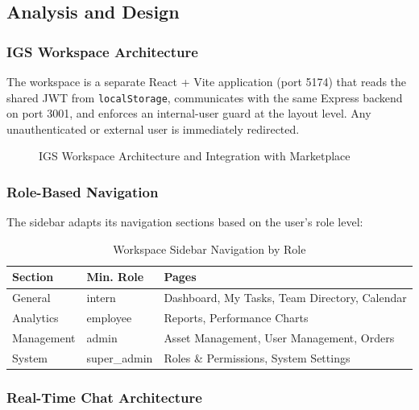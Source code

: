 \subsection{Analysis and Design}

\subsubsection{IGS Workspace Architecture}

The workspace is a separate React + Vite application (port 5174) that reads the shared JWT from \texttt{localStorage}, communicates with the same Express backend on port 3001, and enforces an internal-user guard at the layout level. Any unauthenticated or external user is immediately redirected.

\begin{figure}[H]
\centering
\resizebox{0.95\textwidth}{!}{}
\caption{IGS Workspace Architecture and Integration with Marketplace}
\label{fig:sprint5_arch}
\end{figure}

\subsubsection{Role-Based Navigation}

The sidebar adapts its navigation sections based on the user's role level:

\begin{table}[H]
\centering
\caption{Workspace Sidebar Navigation by Role}
\begin{tabular}{L{3.5cm} L{3cm} L{7cm}}
\toprule
\textbf{Section}  & \textbf{Min. Role}  & \textbf{Pages} \\
\midrule
General           & intern              & Dashboard, My Tasks, Team Directory, Calendar \\
Analytics         & employee            & Reports, Performance Charts \\
Management        & admin               & Asset Management, User Management, Orders \\
System            & super\_admin        & Roles \& Permissions, System Settings \\
\bottomrule
\end{tabular}
\end{table}

\subsubsection{Real-Time Chat Architecture}

